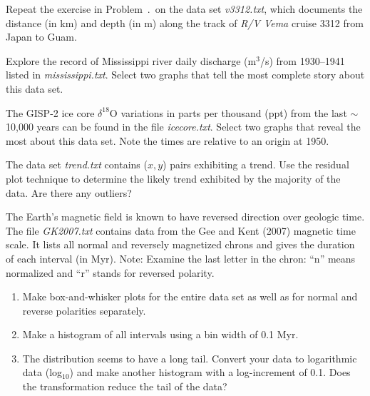 \begin{problem}
Repeat the exercise in Problem~\thechapter.\theEDA\ on the data set \emph{v3312.txt}, which documents the distance
(in km) and depth (in m) along the track of \emph{R/V Vema} cruise 3312 from Japan to Guam.
\end{problem}

\begin{problem}
Explore the record of Mississippi river daily discharge (m$^3$/s) from 1930--1941 listed in \emph{mississippi.txt}.
Select two graphs that tell the most complete story about this data set.
\end{problem}

\begin{problem}
The GISP-2 ice core $\delta^{18}$O variations in parts per thousand (ppt) from the last $\sim$10,000 years can be found in
the file \emph{icecore.txt}.  Select two graphs that reveal the most about this data set.
Note the times are relative to an origin at 1950.
\end{problem}

\begin{problem}
The data set \emph{trend.txt} contains ($x,y$) pairs exhibiting a trend.  Use the residual plot technique
to determine the likely trend exhibited by the majority of the data.  Are there any outliers?
\end{problem}

\begin{problem}
The Earth's magnetic field is known to have reversed direction over geologic time.  The file \emph{GK2007.txt} contains data from the
Gee and Kent (2007) magnetic time scale. It lists all normal and reversely magnetized chrons and gives the duration
of each interval (in Myr). Note: Examine the last letter in the chron: ``n'' means normalized and ``r'' stands for reversed polarity.
\begin{enumerate}[label=\alph*)]
	\item Make box-and-whisker plots for the entire data set as well as for normal and reverse polarities separately.
	\item Make a histogram of all intervals using a bin width of 0.1 Myr.
	\item The distribution seems to have a long tail.  Convert your data to logarithmic data (log$_{10}$) and
	make another histogram with a log-increment of 0.1.  Does the transformation reduce the tail of the data?
\end{enumerate}
\end{problem}
